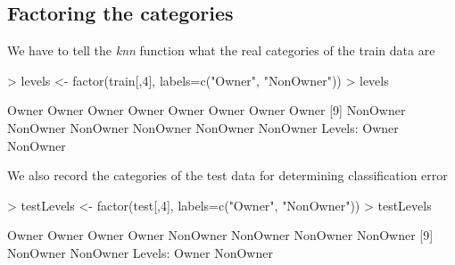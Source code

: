 \documentclass{article}
\begin{document}
\subsection*{Factoring the categories}
We have to tell the \emph{knn} function what the real categories of the train data are
\begin{Schunk}
\begin{Sinput}
> levels <- factor(train[,4], labels=c("Owner", "NonOwner"))
> levels
\end{Sinput}
\begin{Soutput}
 [1] Owner    Owner    Owner    Owner    Owner    Owner    Owner    Owner   
 [9] NonOwner NonOwner NonOwner NonOwner NonOwner NonOwner
Levels: Owner NonOwner
\end{Soutput}
\end{Schunk}
We also record the categories of the test data for determining classification error
\begin{Schunk}
\begin{Sinput}
> testLevels <- factor(test[,4], labels=c("Owner", "NonOwner"))
> testLevels
\end{Sinput}
\begin{Soutput}
 [1] Owner    Owner    Owner    Owner    NonOwner NonOwner NonOwner NonOwner
 [9] NonOwner NonOwner
Levels: Owner NonOwner
\end{Soutput}
\end{Schunk}
\end{document}
